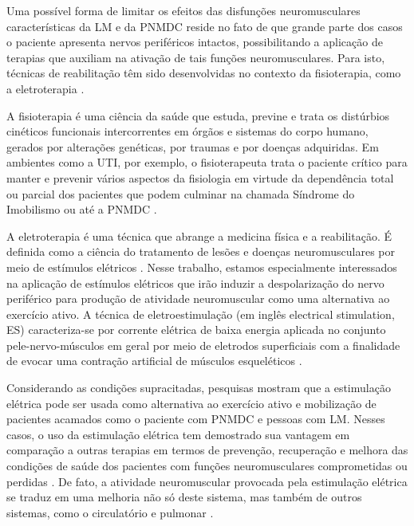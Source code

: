 Uma possível forma de limitar os efeitos das disfunções neuromusculares características da \acrshort{LM} e da \acrshort{PNMDC} reside no fato de que grande parte dos casos o paciente apresenta nervos periféricos intactos, possibilitando a aplicação de terapias que auxiliam na ativação de tais funções neuromusculares. Para isto, técnicas de reabilitação têm sido desenvolvidas no contexto da fisioterapia, como a eletroterapia \cite{Grill2000, McDonald2002}. 

A fisioterapia é uma ciência da saúde que estuda, previne e trata os distúrbios cinéticos funcionais intercorrentes em órgãos e sistemas do corpo humano, gerados por alterações genéticas, por traumas e por doenças adquiridas. Em ambientes como a \acrshort{UTI}, por exemplo, o fisioterapeuta trata o paciente crítico para manter e prevenir vários aspectos da fisiologia em virtude da dependência total ou parcial dos pacientes que podem culminar na chamada Síndrome do Imobilismo ou até a \acrshort{PNMDC} \cite{Franca2012}. 

A eletroterapia é uma técnica que abrange a medicina física e a reabilitação. É definida como a ciência do tratamento de lesões e doenças neuromusculares por meio de estímulos elétricos \cite{Crepon2008}. Nesse trabalho, estamos especialmente interessados na aplicação de estímulos elétricos que irão induzir a despolarização do nervo periférico para produção de atividade neuromuscular como uma alternativa ao exercício ativo. A técnica de eletroestimulação (em inglês electrical stimulation, \acrshort{ES}) caracteriza-se por corrente elétrica de baixa energia aplicada no conjunto pele-nervo-músculos em geral por meio de eletrodos superficiais com a finalidade de evocar uma contração artificial de músculos esqueléticos \cite{Popovic2000}.

Considerando as condições supracitadas, pesquisas mostram que a estimulação elétrica pode ser usada como alternativa ao exercício ativo e mobilização de pacientes acamados como o paciente com \acrshort{PNMDC} e pessoas com \acrshort{LM}. Nesses casos, o uso da estimulação elétrica tem demostrado sua vantagem em comparação a outras terapias em termos de prevenção, recuperação e melhora das condições de saúde dos pacientes com funções neuromusculares comprometidas ou perdidas \cite{Faria2006, Silva2016,Deley2005,Zanotti2003, Naki2011}. De fato, a atividade neuromuscular provocada pela estimulação elétrica se traduz em uma melhoria não só deste sistema, mas também de outros sistemas, como o circulatório e pulmonar \cite{Ferreira2014}. 

